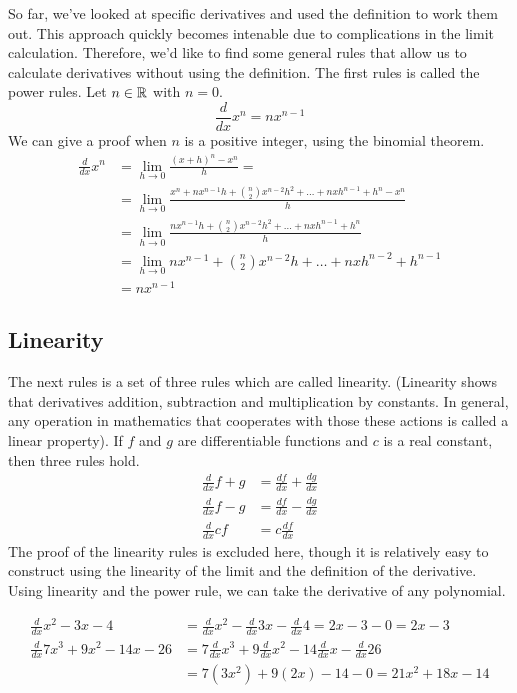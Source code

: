 \documentclass[fleqn]{report}
\begin{document}
So far, we've looked at specific derivatives and used the
definition to work them out. This approach quickly becomes
intenable due to complications in the limit calculation.
Therefore, we'd like to find some general rules that allow us
to calculate derivatives without using the definition. The
first rules is called the power rules. Let $n \in \mathbb{R}$ with $n=0$.
\begin{equation*}
\frac{d}{dx} x^n = nx^{n-1} 
\end{equation*}
We can give a proof when $n$ is a positive integer, using the
binomial theorem.
\begin{align*}
\frac{d}{dx} x^n & = \lim_{h \rightarrow 0} \frac{(x+h)^n -
x^n}{h} = \\
& = \lim_{h \rightarrow 0} \frac{x^n + nx^{n-1}h + \binom{n}{2}
x^{n-2}h^2 + \ldots + nxh^{n-1} + h^n - x^n}{h} \\
& = \lim_{h \rightarrow 0} \frac{nx^{n-1}h + \binom{n}{2}
x^{n-2}h^2 + \ldots + nxh^{n-1} + h^n}{h} \\
& = \lim_{h \rightarrow 0} nx^{n-1} + \binom{n}{2} x^{n-2}h + 
\ldots + nxh^{n-2} + h^{n-1} \\
& = nx^{n-1}
\end{align*}

\subsection{Linearity}
\label{derivatives-linearity}

The next rules is a set of three rules which are called
linearity. (Linearity shows that derivatives addition,
subtraction and multiplication by constants. In general, any
operation in mathematics that cooperates with those these
actions is called a linear property). If $f$ and $g$ are
differentiable functions and $c$ is a real constant, then
three rules hold.
\begin{align*}
\frac{d}{dx} f + g & = \frac{df}{dx} + \frac{dg}{dx} \\
\frac{d}{dx} f - g & = \frac{df}{dx} - \frac{dg}{dx} \\
\frac{d}{dx} cf & = c \frac{df}{dx}
\end{align*}
The proof of the linearity rules is excluded here, though it
is relatively easy to construct using the linearity of the
limit and the definition of the derivative. Using linearity
and the power rule, we can take the derivative of any
polynomial. 

\begin{example}
\begin{align*}
\frac{d}{dx} x^2 -3x -4 & = \frac{d}{dx} x^2 - \frac{d}{dx} 3x
- \frac{d}{dx} 4 = 2x - 3 - 0 = 2x -3 \\
\frac{d}{dx} 7x^3 + 9x^2 - 14x - 26 & = 7 \frac{d}{dx} x^3 + 9
\frac{d}{dx} x^2 - 14 \frac{d}{dx} x - \frac{d}{dx} 26 \\
& = 7 (3x^2) + 9(2x) - 14 - 0 = 21 x^2 + 18 x - 14 
\end{align*}
\end{example}
\end{document}
